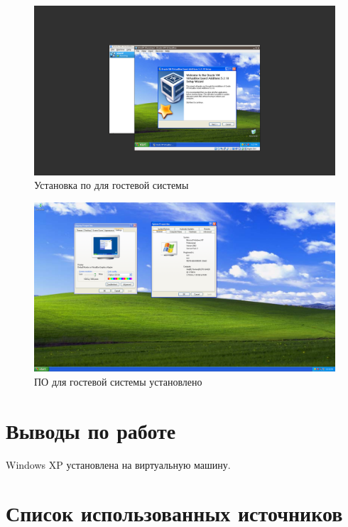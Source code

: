\documentclass[a4paper]{article}
\begin{document}
\begin{figure}[H]
    \centering
    \includegraphics[width=\linewidth]{32.png}
    \caption{Установка по для гостевой системы}
\end{figure}

\begin{figure}[H]
    \centering
    \includegraphics[width=\linewidth]{36.png}
    \caption{ПО для гостевой системы установлено}
\end{figure}


\section{Выводы по работе}

Windows XP установлена на виртуальную машину.

\section{Список использованных источников}
\end{document}
